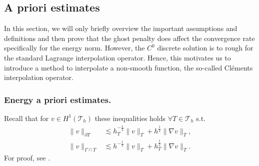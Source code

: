 
\subsection{A priori estimates}%
\label{sec:a_priori_estimates}


In this section, we will only briefly overview the important assumptions and definitions and then prove that the ghost penalty does affect the convergence rate specifically for the energy norm.
However, the $C^{0}$ discrete solution is to rough for the standard Lagrange interpolation operator. Hence, this motivates us to introduce a method to interpolate a non-smooth function, the so-called Cléments interpolation operator.


\subsubsection{Energy a priori estimates.  }%
\label{ssub:extension}
Recall that for $v \in H^{1}( \mathcal{T } _{h}) $ these inequalities holds $\forall T \in \mathcal{T} _{h}$ s.t. \[
\begin{split}
    \| v \|_{ \partial T }^{  } &\lesssim h^{-\frac{1}{2}}_{T}\|  v \|_{ T }^{  }+ h^{\frac{1}{2}} \| \nabla v \|_{T  }^{   }  , \\
    \| v \|_{ \Gamma \cap T }^{  } &\lesssim  h^{-\frac{1}{2}} \| v \|_{T  }^{  }   + h^{\frac{1}{2}}_{T} \| \nabla v \|_{ T }^{  }.
\end{split}
\]
For proof, see \cite[Lemma 4.2]{hansbo2003finite}.


